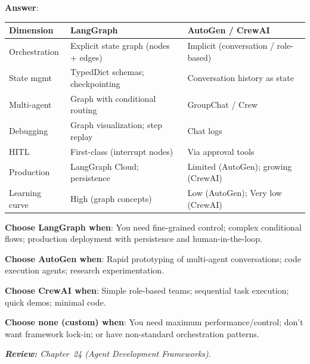 \begin{questionbox}
\textbf{Answer}:

\begin{tabular}{@{}lp{5cm}p{8cm}@{}}
\toprule
\textbf{Dimension} & \textbf{LangGraph} & \textbf{AutoGen / CrewAI} \\
\midrule
Orchestration & Explicit state graph (nodes + edges) & Implicit (conversation / role-based) \\
State mgmt & TypedDict schemas; checkpointing & Conversation history as state \\
Multi-agent & Graph with conditional routing & GroupChat / Crew \\
Debugging & Graph visualization; step replay & Chat logs \\
HITL & First-class (interrupt nodes) & Via approval tools \\
Production & LangGraph Cloud; persistence & Limited (AutoGen); growing (CrewAI) \\
Learning curve & High (graph concepts) & Low (AutoGen); Very low (CrewAI) \\
\bottomrule
\end{tabular}

\textbf{Choose LangGraph when}: You need fine-grained control; complex conditional flows; production deployment with persistence and human-in-the-loop.

\textbf{Choose AutoGen when}: Rapid prototyping of multi-agent conversations; code execution agents; research experimentation.

\textbf{Choose CrewAI when}: Simple role-based teams; sequential task execution; quick demos; minimal code.

\textbf{Choose none (custom) when}: You need maximum performance/control; don’t want framework lock-in; or have non-standard orchestration patterns.

\emph{\textbf{Review:} Chapter~24 (Agent Development Frameworks).}
\end{questionbox}

